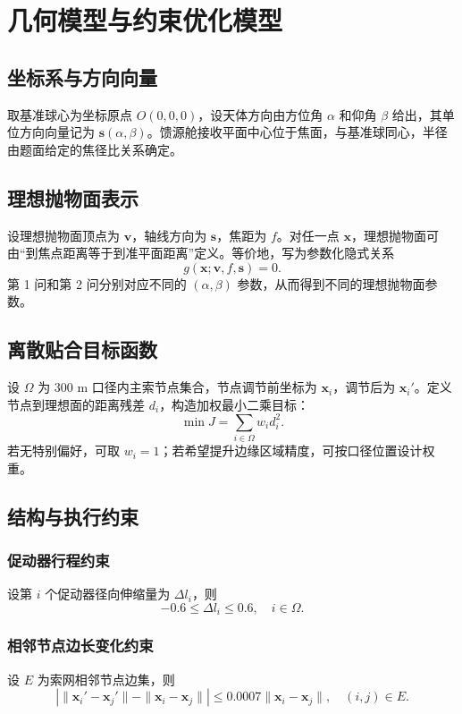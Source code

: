 \chapter{几何模型与约束优化模型}

\section{坐标系与方向向量}
取基准球心为坐标原点 $O(0,0,0)$，设天体方向由方位角 $\alpha$ 和仰角 $\beta$ 给出，其单位方向向量记为 $\mathbf s(\alpha,\beta)$。馈源舱接收平面中心位于焦面，与基准球同心，半径由题面给定的焦径比关系确定。

\section{理想抛物面表示}
设理想抛物面顶点为 $\mathbf v$，轴线方向为 $\mathbf s$，焦距为 $f$。对任一点 $\mathbf x$，理想抛物面可由“到焦点距离等于到准平面距离”定义。等价地，写为参数化隐式关系
\[
g(\mathbf x;\mathbf v,f,\mathbf s)=0.
\]
第 1 问和第 2 问分别对应不同的 $(\alpha,\beta)$ 参数，从而得到不同的理想抛物面参数。

\section{离散贴合目标函数}
设 $\Omega$ 为 300 m 口径内主索节点集合，节点调节前坐标为 $\mathbf x_i$，调节后为 $\mathbf x_i'$。定义节点到理想面的距离残差 $d_i$，构造加权最小二乘目标：
\begin{equation}
\min J=\sum_{i\in\Omega}w_i d_i^2.
\label{eq:Jfast}
\end{equation}
若无特别偏好，可取 $w_i=1$；若希望提升边缘区域精度，可按口径位置设计权重。

\section{结构与执行约束}
\subsection{促动器行程约束}
设第 $i$ 个促动器径向伸缩量为 $\Delta l_i$，则
\begin{equation}
-0.6\le \Delta l_i\le 0.6,\quad i\in\Omega.
\label{eq:stroke}
\end{equation}

\subsection{相邻节点边长变化约束}
设 $E$ 为索网相邻节点边集，则
\begin{equation}
\left|\|\mathbf x_i'-\mathbf x_j'\|-\|\mathbf x_i-\mathbf x_j\|\right|
\le 0.0007\|\mathbf x_i-\mathbf x_j\|,\quad (i,j)\in E.
\label{eq:length}
\end{equation}

